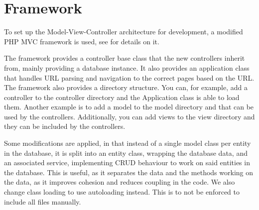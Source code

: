 \section{Framework}
To set up the Model-View-Controller architecture for development, a modified PHP MVC framework is used, see \citep{misc:mvc-framework} for details on it.

The framework provides a controller base class that the new controllers inherit from, mainly providing a database instance.
It also provides an application class that handles URL parsing and navigation to the correct pages based on the URL.
The framework also provides a directory structure. 
You can, for example, add a controller to the controller directory and the Application class is able to load them. 
Another example is to add a model to the model directory and that can be used by the controllers. 
Additionally, you can add views to the view directory and they can be included by the controllers.

Some modifications are applied, in that instead of a single model class per entity in the database, it is split into an entity class, wrapping the database data, and an associated service, implementing CRUD behaviour to work on said entities in the database.
This is useful, as it separates the data and the methods working on the data, as it improves cohesion and reduces coupling in the code.
We also change class loading to use autoloading instead. This is to not be enforced to include all files manually.